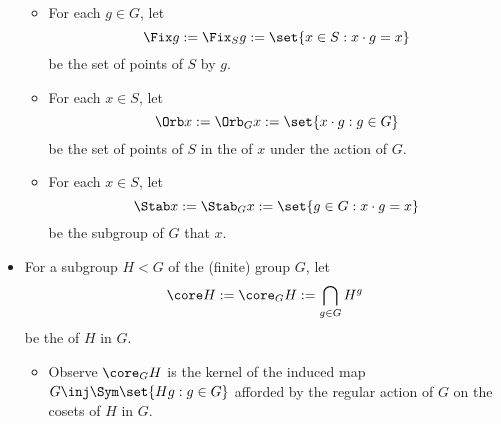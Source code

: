 \documentclass[onesided]{ccg-pset}
\begin{document}
\begin{note}
\begin{itemize}
            \begin{itemize}
                \item For each $g \in G$, let 
                      \begin{equation}
                          \label{fix}
                          \Fix g := \Fix_S g := \set{x \in S : x \cdot g = x}
                      \end{equation}
                      be the set of points of $S$  by $g$.
                \item For each $x \in S$, let
                    \begin{equation}
                        \label{orb}
                       \Orb x := \Orb_G x := \set{x \cdot g: g \in G} 
                    \end{equation}
                    be the set of points of $S$ in the  of $x$ under the action of $G$.
                \item For each $x \in S$, let 
                      \begin{equation}
                          \label{stab}
                          \Stab x := \Stab_G x := \set{g \in G : x \cdot g = x} 
                      \end{equation}
                      be the subgroup of $G$ that  $x$.
            \end{itemize}
        \item For a subgroup $H < G$ of the (finite) group $G$, let
            \begin{equation*}
                \core H := \core_G H := \bigcap_{g \in G} H^g
            \end{equation*}
            be the  of $H$ in $G$. 
            \begin{itemize}
                \item Observe $\core_G H$ is the kernel of the induced map $G \inj \Sym \set{Hg : g \in G}$ afforded by the regular action of $G$ on the cosets of $H$ in $G$.
            \end{itemize}
    \end{itemize}
\end{note}
\end{document}
